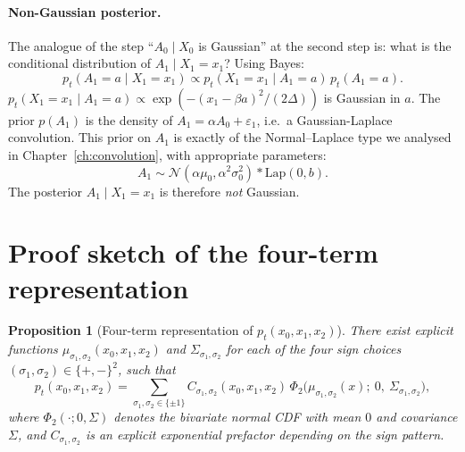 \documentclass[11pt,a4paper,openany]{book}
\theoremstyle{plainserif}
\newtheorem{proposition}[theorem]{Proposition}
\theoremstyle{definition}
\theoremstyle{remarkstyle}
\newcommand{\Normal}{\mathcal{N}}
\newcommand{\Lap}{\mathrm{Lap}}
\begin{document}
\paragraph{Non-Gaussian posterior.}
The analogue of the step ``$A_0\mid X_0$ is Gaussian'' at the second step
is: what is the conditional distribution of $A_1 \mid X_1 = x_1$? Using
Bayes:
\begin{equation}
p_t(A_1 = a \mid X_1 = x_1) \propto p_t(X_1 = x_1 \mid A_1 = a)\, p_t(A_1 = a).
\end{equation}
$p_t(X_1 = x_1\mid A_1 = a) \propto \exp(-(x_1 - \beta a)^2/(2\Delta))$
is Gaussian in $a$. The prior $p(A_1)$ is the density of
$A_1 = \alpha A_0 + \varepsilon_1$, i.e.\ a Gaussian-Laplace convolution.
This prior on $A_1$ is exactly of the Normal--Laplace type we analysed
in Chapter~\ref{ch:convolution}, with appropriate parameters:
\begin{equation}
A_1 \sim \Normal(\alpha\mu_0, \alpha^2\sigma_0^2) \ast \Lap(0, b).
\end{equation}
The posterior $A_1\mid X_1 = x_1$ is therefore \emph{not} Gaussian.

\section{Proof sketch of the four-term representation}

\begin{proposition}[Four-term representation of $p_t(x_0,x_1,x_2)$]
\label{prop:K2-four-terms}
There exist explicit functions
$\mu_{\sigma_1, \sigma_2}(x_0, x_1, x_2)$ and
$\Sigma_{\sigma_1, \sigma_2}$ for each of the four sign choices
$(\sigma_1, \sigma_2) \in \{+, -\}^2$, such that
\begin{equation}
p_t(x_0, x_1, x_2) =
\sum_{\sigma_1, \sigma_2 \in \{\pm 1\}}
  C_{\sigma_1, \sigma_2}(x_0, x_1, x_2)\,
  \Phi_{2}\!\bigl(
    \mu_{\sigma_1,\sigma_2}(x);\ 0,\ \Sigma_{\sigma_1,\sigma_2}
  \bigr),
\label{eq:K2-four-terms}
\end{equation}
where $\Phi_2(\cdot; 0, \Sigma)$ denotes the bivariate normal CDF with
mean $0$ and covariance $\Sigma$, and $C_{\sigma_1,\sigma_2}$ is an
explicit exponential prefactor depending on the sign pattern.
\end{proposition}
\end{document}
